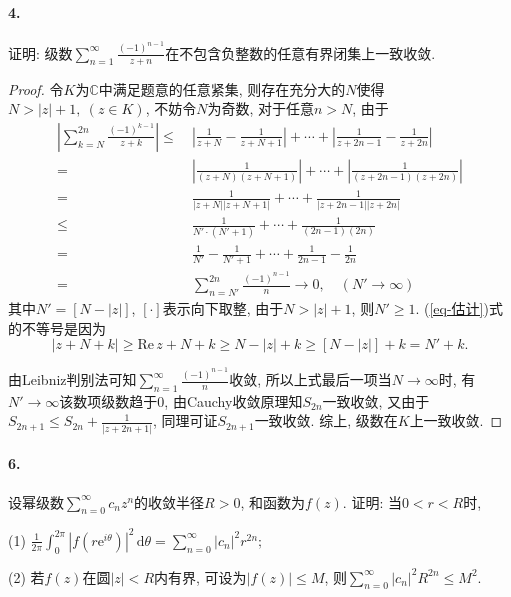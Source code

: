 \documentclass[12pt, a4paper, oneside]{ctexart}
\let\leq=\leqslant %
\let\geq=\geqslant %
\def\C{\mathbb{C}}      %
\def\d{\mathrm{d}}      %
\def\e{\mathrm{e}}      %
\def\re{\mathrm{Re}\,}    %
\begin{document}
\paragraph{4.}证明: 级数$ \sum_{n=1}^\infty\frac{(-1)^{n-1}}{z+n}$在不包含负整数的任意有界闭集上一致收敛.
\begin{proof}
    令$K$为$\C$中满足题意的任意紧集, 则存在充分大的$N$使得$N > |z|+1,\ (z\in K)$, 不妨令$N$为奇数, 对于任意$n>N$, 由于
    \begin{align}
        \nonumber\left|\sum_{k=N}^{2n}\frac{(-1)^{k-1}}{z+k}\right| \leq&\ \left|\frac{1}{z+N}-\frac{1}{z+N+1}\right|+\cdots+\left|\frac{1}{z+2n-1}-\frac{1}{z+2n}\right|\\
        \nonumber=&\ \left|\frac{1}{(z+N)(z+N+1)}\right|+\cdots+\left|\frac{1}{(z+2n-1)(z+2n)}\right|\\
        \nonumber=&\ \frac{1}{|z+N||z+N+1|}+\cdots+\frac{1}{|z+2n-1||z+2n|}\\
        \label{eq-估计}\leq&\ \frac{1}{N'\cdot (N'+1)}+\cdots+\frac{1}{(2n-1)(2n)}\\
        \nonumber=&\ \frac{1}{N'}-\frac{1}{N'+1}+\cdots+\frac{1}{2n-1}-\frac{1}{2n}\\
        \nonumber=&\ \sum_{n=N'}^{2n}\frac{(-1)^{n-1}}{n}\rightarrow 0,\quad(N'\to \infty)
    \end{align}
    其中$N' = [N-|z|] $, $[\cdot ]$表示向下取整, 由于$N>|z|+1$, 则$N' \geq 1$. (\ref{eq-估计})式的不等号是因为
    \begin{equation*}
        |z+N+k|\geq \re z + N +k\geq N-|z| + k\geq [N-|z|] + k= N'+k.
    \end{equation*}

    由Leibniz判别法可知$\sum_{n=1}^\infty\frac{(-1)^{n-1}}{n}$收敛, 所以上式最后一项当$N\to\infty$时, 有 $N'\to\infty$该数项级数趋于$0$, 由Cauchy收敛原理知$S_{2n}$一致收敛, 又由于$S_{2n+1}\leqslant S_{2n}+ \frac{1}{|z+2n+1|}$, 同理可证$S_{2n+1}$一致收敛. 综上, 级数在$K$上一致收敛.
\end{proof}
\paragraph{6.}设幂级数$ \sum_{n=0}^\infty c_nz^n$的收敛半径$R > 0$, 和函数为$f(z)$. 证明: 当$0 < r < R$时, 

(1) $ \frac{1}{2\pi}\int_0^{2\pi}|f(r\e^{i\theta})|^2\,\d\theta = \sum_{n=0}^\infty|c_n|^2r^{2n};$

(2) 若$f(z)$在圆$|z| < R$内有界, 可设为$|f(z)|\leqslant M$, 则$ \sum_{n=0}^\infty|c_n|^2R^{2n}\leqslant M^2.$
\end{document}
